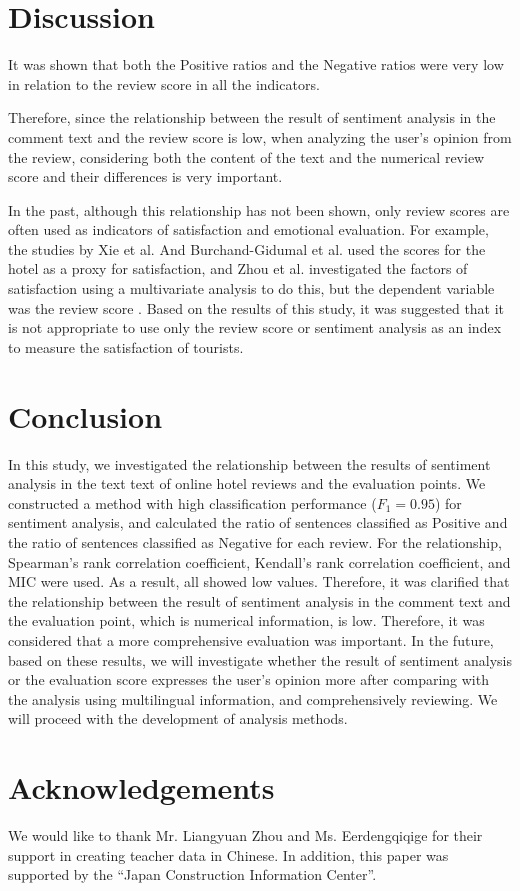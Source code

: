 \documentclass[review]{elsarticle}
\begin{document}
\section{Discussion}\label{discussion}

It was shown that both the Positive ratios and the Negative ratios were very low in relation to the review score in all the indicators.

Therefore, since the relationship between the result of sentiment analysis in the comment text and the review score is low, when analyzing the user's opinion from the review, considering both the content of the text and the numerical review score and their differences is very important.

In the past, although this relationship has not been shown, only review scores are often used as indicators of satisfaction and emotional evaluation. For example, the studies by Xie et al. And Burchand-Gidumal et al. used the scores for the hotel as a proxy for satisfaction\cite[][]{XIE20141, BULCHANDGIDUMAL201344}, and Zhou et al. investigated the factors of satisfaction using a multivariate analysis to do this, but the dependent variable was the review score \cite[][]{ZHOU20141}.
Based on the results of this study, it was suggested that it is not appropriate to use only the review score or sentiment analysis as an index to measure the satisfaction of tourists.

\section{Conclusion}\label{conclusion}

In this study, we investigated the relationship between the results of sentiment analysis in the text text of online hotel reviews and the evaluation points. We constructed a method with high classification performance (\(F_1 = 0.95\)) for sentiment analysis, and calculated the ratio of sentences classified as Positive and the ratio of sentences classified as Negative for each review. For the relationship, Spearman's rank correlation coefficient, Kendall's rank correlation coefficient, and MIC were used. As a result, all showed low values. Therefore, it was clarified that the relationship between the result of sentiment analysis in the comment text and the evaluation point, which is numerical information, is low. Therefore, it was considered that a more comprehensive evaluation was important. In the future, based on these results, we will investigate whether the result of sentiment analysis or the evaluation score expresses the user's opinion more after comparing with the analysis using multilingual information, and comprehensively reviewing. We will proceed with the development of analysis methods.

\section*{Acknowledgements}\label{acknowledgements}

We would like to thank Mr. Liangyuan Zhou and Ms. Eerdengqiqige for their support in creating teacher data in Chinese. In addition, this paper was supported by the ``Japan Construction Information Center''.

\clearpage


\end{document}
